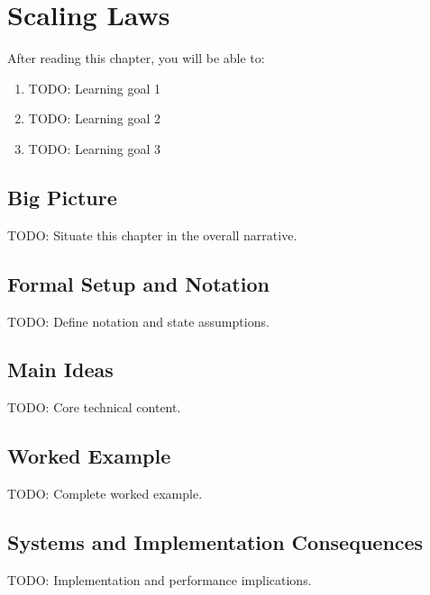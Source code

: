 \chapter{Scaling Laws}
\label{ch:19}

\begin{keyinsight}
After reading this chapter, you will be able to:
\begin{enumerate}
  \item TODO: Learning goal 1
  \item TODO: Learning goal 2
  \item TODO: Learning goal 3
\end{enumerate}
\end{keyinsight}

\section{Big Picture}
\label{ch:19:sec:big_picture}

TODO: Situate this chapter in the overall narrative.

\section{Formal Setup and Notation}
\label{ch:19:sec:setup}

TODO: Define notation and state assumptions.

\section{Main Ideas}
\label{ch:19:sec:main}

TODO: Core technical content.

\section{Worked Example}
\label{ch:19:sec:example}

TODO: Complete worked example.

\section{Systems and Implementation Consequences}
\label{ch:19:sec:systems}

TODO: Implementation and performance implications.

